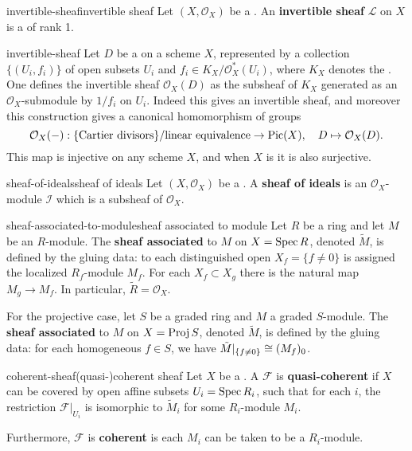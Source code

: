 \begin{topic}{invertible-sheaf}{invertible sheaf}
    Let $(X, \mathcal{O}_X)$ be a . An \textbf{invertible sheaf} $\mathcal{L}$ on $X$ is a   of rank 1.
\end{topic}

\begin{example}{invertible-sheaf}
    Let $D$ be a  on a scheme $X$, represented by a collection $\{ (U_i, f_i) \}$ of open subsets $U_i$ and $f_i \in K_X / \mathcal{O}_X^* (U_i)$, where $K_X$ denotes the . One defines the invertible sheaf $\mathcal{O}_X(D)$ as the subsheaf of $K_X$ generated as an $\mathcal{O}_X$-submodule by $1/f_i$ on $U_i$. Indeed this gives an invertible sheaf, and moreover this construction gives a canonical homomorphism of groups
    \[ \mathcal{O}_X(-) : \{ \textup{Cartier divisors} \} / \textup{linear equivalence} \to \textup{Pic}(X), \quad D \mapsto \mathcal{O}_X(D) . \]
    This map is injective on any scheme $X$, and when $X$ is  it is also surjective.
\end{example}

\begin{topic}{sheaf-of-ideals}{sheaf of ideals}
    Let $(X, \mathcal{O}_X)$ be a . A \textbf{sheaf of ideals} is an $\mathcal{O}_X$-module $\mathcal{I}$ which is a subsheaf of $\mathcal{O}_X$.
\end{topic}

\begin{topic}{sheaf-associated-to-module}{sheaf associated to module}
    Let $R$ be a ring and let $M$ be an $R$-module. The \textbf{sheaf associated} to $M$ on $X = \operatorname{Spec} R$, denoted $\tilde{M}$, is defined by the gluing data: to each distinguished open $X_f = \{ f \ne 0 \}$ is assigned the localized $R_f$-module $M_f$. For each $X_f \subset X_g$ there is the natural map $M_g \to M_f$. In particular, $\tilde{R} = \mathcal{O}_X$.
    
    For the projective case, let $S$ be a graded ring and $M$ a graded $S$-module. The \textbf{sheaf associated} to $M$ on $X = \operatorname{Proj} S$, denoted $\tilde{M}$, is defined by the gluing data: for each homogeneous $f \in S$, we have $\tilde{M}|_{\{ f \ne 0\}} \cong (M_f)_0$.
\end{topic}

\begin{topic}{coherent-sheaf}{(quasi-)coherent sheaf}
    Let $X$ be a . A  $\mathcal{F}$ is \textbf{quasi-coherent} if $X$ can be covered by open affine subsets $U_i = \operatorname{Spec} R_i$, such that for each $i$, the restriction $\mathcal{F}|_{U_i}$ is isomorphic to $\tilde{M}_i$ for some $R_i$-module $M_i$.
    
    Furthermore, $\mathcal{F}$ is \textbf{coherent} is each $M_i$ can be taken to be a  $R_i$-module.
\end{topic}

